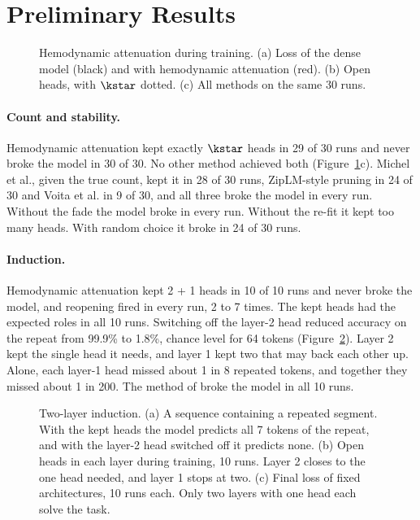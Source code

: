 \section{Preliminary Results}
\label{sec:ha-results}

\begin{figure}[htb]
\centering
{}
\caption[Hemodynamic attenuation during training]{Hemodynamic attenuation during training.
(a) Loss of the dense model (black) and with hemodynamic attenuation (red).
(b) Open heads, with $\kstar$ dotted.
(c) All methods on the same 30 runs.}
\label{fig:ha}
\end{figure}

\paragraph{Count and stability.}
Hemodynamic attenuation kept exactly $\kstar$ heads in 29 of 30 runs and never broke the model in 30 of 30. No other method achieved both (Figure~\ref{fig:ha}c). Michel et al., given the true count, kept it in 28 of 30 runs, ZipLM-style pruning in 24 of 30 and Voita et al. in 9 of 30, and all three broke the model in every run. Without the fade the model broke in every run. Without the re-fit it kept too many heads. With random choice it broke in 24 of 30 runs.

\paragraph{Induction.}
Hemodynamic attenuation kept 2 + 1 heads in 10 of 10 runs and never broke the model, and reopening fired in every run, 2 to 7 times. The kept heads had the expected roles in all 10 runs. Switching off the layer-2 head reduced accuracy on the repeat from 99.9\% to 1.8\%, chance level for 64 tokens (Figure~\ref{fig:induction}). Layer 2 kept the single head it needs, and layer 1 kept two that may back each other up. Alone, each layer-1 head missed about 1 in 8 repeated tokens, and together they missed about 1 in 200. The method of \citet{michel2019sixteen} broke the model in all 10 runs.

\begin{figure}[hbtp]
\centering
{}
\caption[Two-layer induction]{Two-layer induction.
(a) A sequence containing a repeated segment. With the kept heads the model predicts all 7 tokens of the repeat, and with the layer-2 head switched off it predicts none.
(b) Open heads in each layer during training, 10 runs. Layer 2 closes to the one head needed, and layer 1 stops at two.
(c) Final loss of fixed architectures, 10 runs each. Only two layers with one head each solve the task.}
\label{fig:induction}
\end{figure}

